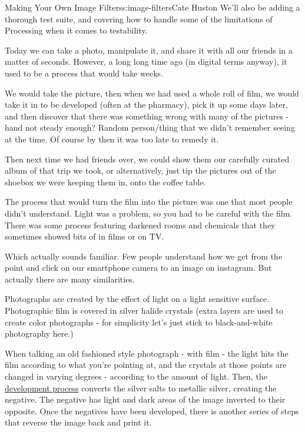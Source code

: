 \begin{aosachapter}{Making Your Own Image Filters}{s:image-filters}{Cate Huston}
We'll also be adding a thorough test suite, and covering how to handle
some of the limitations of Processing when it comes to testability.

\label{background}

Today we can take a photo, manipulate it, and share it with all our
friends in a matter of seconds. However, a long long time ago (in
digital terms anyway), it used to be a process that would take weeks.

We would take the picture, then when we had used a whole roll of film,
we would take it in to be developed (often at the pharmacy), pick it up
some days later, and then discover that there was something wrong with
many of the pictures - hand not steady enough? Random person/thing that
we didn't remember seeing at the time. Of course by then it was too late
to remedy it.

Then next time we had friends over, we could show them our carefully
curated album of that trip we took, or alternatively, just tip the
pictures out of the shoebox we were keeping them in, onto the coffee
table.

The process that would turn the film into the picture was one that most
people didn't understand. Light was a problem, so you had to be careful
with the film. There was some process featuring darkened rooms and
chemicals that they sometimes showed bits of in films or on TV.

Which actually sounds familiar. Few people understand how we get from
the point and click on our smartphone camera to an image on instagram.
But actually there are many similarities.

\label{photographs-the-old-way}

Photographs are created by the effect of light on a light sensitive
surface. Photographic film is covered in silver halide crystals (extra
layers are used to create color photographs - for simplicity let's just
stick to black-and-white photography here.)

When talking an old fashioned style photograph - with film - the light
hits the film according to what you're pointing at, and the crystals at
those points are changed in varying degrees - according to the amount of
light. Then, the
\href{http://photography.tutsplus.com/tutorials/step-by-step-guide-to-developing-black-and-white-t-max-film-{}-photo-2580}{development
process} converts the silver salts to metallic silver, creating the
negative. The negative has light and dark areas of the image inverted to
their opposite. Once the negatives have been developed, there is another
series of steps that reverse the image back and print it.


\end{aosachapter}
